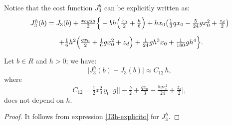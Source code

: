 \documentclass[axioms,article,submit,moreauthors]{Definitions/mdpi}
\begin{document}
 
 
Notice that the cost function ${J^h_{3}}$ can be explicitly written as:
   \begin{equation}\label{J3h-explicito}
   \begin{array}{ll}
{J^h_{3}} (b)= J_3(b) +\tfrac{x_0 y_0 g}{2} \Big\{ - b h  \Big( \tfrac{x_0}{2} + \tfrac{h}{6}  \Big) +h  x_0 \big(\tfrac{1}{3} q x_0-\tfrac{5}{24} g x_0^2+\tfrac{z_d}{2} \big)\\[0.45cm]
\hspace{1.45cm}+\tfrac{1}{6} h^2 \Big(\tfrac{q x_0}{2}+\tfrac{1}{6} g  x_0^2+z_d \Big) +\tfrac{1}{24} g h^3 x_0+\tfrac{1}{180}g h^4\Big\}.
\end{array}
\end{equation}

\begin{Lemma}\label{Lema J3 J3h}
Let  $b \in R$ and $h>0$; we have:
    \begin{equation}\label{ec 5.3} 
        \lvert  {J^h_{3}}(b) - J_3(b) \rvert  \approx C_{12} \, h, 
     \end{equation}
     where  \[C_{12} = \tfrac{1}{2}x_0^2\, y_0\,| g| \Big \lvert  -\tfrac{b}{2} + \tfrac{q x_0}{3} -\tfrac{5 g x_0^2}{24} + \tfrac{z_d}{2} \Big \rvert,\] 
   does not depend on $h.$
      
      \end{Lemma}
\begin{proof}
It follows from expression \eqref{J3h-explicito} for ${J^h_{3}}$.
\end{proof}    \noindent
\end{document}
